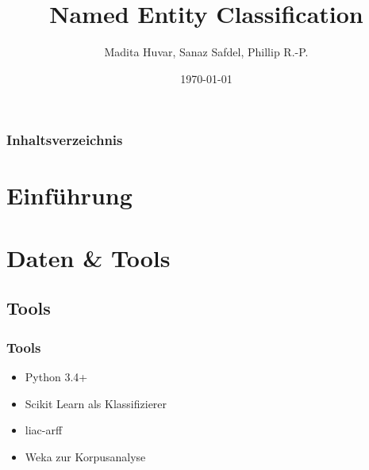 \documentclass{beamer}
\title{Named Entity Classification}
\author{Madita Huvar, Sanaz Safdel, Phillip R.-P.}
\date{\today}
\begin{document}
\begin{frame}
\titlepage
\end{frame} 

\begin{frame}
\frametitle{Inhaltsverzeichnis}
\tableofcontents
\end{frame} 


\section{Einführung}
\section{Daten \& Tools}
	\subsection{Tools}
	\begin{frame}
			\frametitle{Tools}
			\begin{itemize}
				\item Python 3.4+
				\item Scikit Learn als Klassifizierer
				\item liac-arff
				\item Weka zur Korpusanalyse
			\end{itemize}
	\end{frame}
\end{document}

